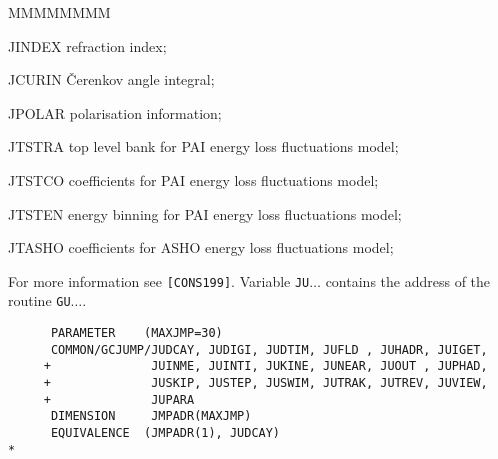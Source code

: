 \begin{DLtt}{MMMMMMMM}
\item[JINDEX] refraction index;
\item[JCURIN] \v{C}erenkov angle integral;
\item[JPOLAR] polarisation information;
\item[JTSTRA] top level bank for PAI energy loss fluctuations model;
\item[JTSTCO] coefficients for PAI energy loss fluctuations model;
\item[JTSTEN] energy binning for PAI energy loss fluctuations model;
\item[JTASHO] coefficients for ASHO energy loss fluctuations model;
\end{DLtt}
 
For more information see {\tt [CONS199]}.
Variable {\tt JU$\dots$} contains the address of the routine {\tt GU$\dots$}.
\begin{verbatim}
      PARAMETER    (MAXJMP=30)
      COMMON/GCJUMP/JUDCAY, JUDIGI, JUDTIM, JUFLD , JUHADR, JUIGET,
     +              JUINME, JUINTI, JUKINE, JUNEAR, JUOUT , JUPHAD,
     +              JUSKIP, JUSTEP, JUSWIM, JUTRAK, JUTREV, JUVIEW,
     +              JUPARA
      DIMENSION     JMPADR(MAXJMP)
      EQUIVALENCE  (JMPADR(1), JUDCAY)
*
\end{verbatim}
 
